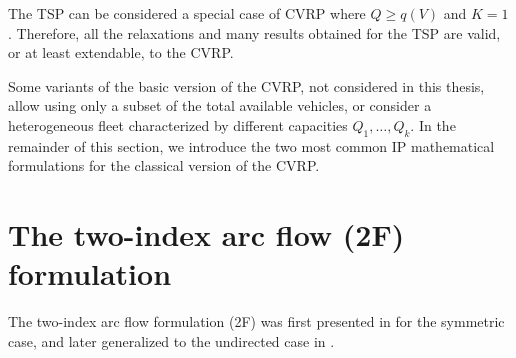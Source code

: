\medskip

The TSP can be considered a special case of CVRP where $Q \ge q(V)$ and $K = 1$.
Therefore, all the relaxations and many results obtained for the TSP are valid, or at least extendable, to the CVRP.

\medskip

Some variants of the basic version of the CVRP,
not considered in this thesis,
allow using only a subset of the total available vehicles,
or consider a heterogeneous fleet characterized by different capacities $Q_1, \dots, Q_k$.
In the remainder of this section,
we introduce the two most common IP mathematical formulations for the classical version of the CVRP.

\section{The two-index arc flow (2F) formulation}
\label{sec:cvrp-two-index-flow-formulation}

The two-index arc flow formulation (2F)
was  first presented in \textcite{laporte1983, laporte1985} for the symmetric case,
and later generalized to the undirected case in \textcite{laporte1986}.

